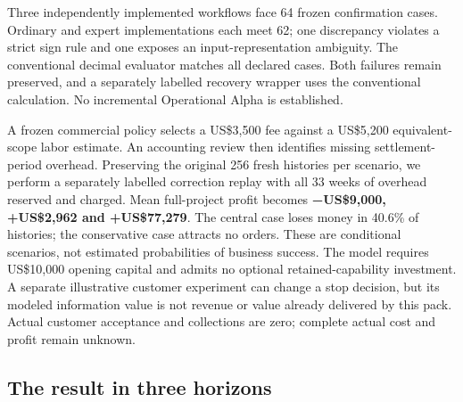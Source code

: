 \documentclass[
  11pt,
  letterpaper,
]{article}
\begin{document}
Three independently implemented workflows face 64 frozen confirmation
cases. Ordinary and expert implementations each meet 62; one discrepancy
violates a strict sign rule and one exposes an input-representation
ambiguity. The conventional decimal evaluator matches all declared
cases. Both failures remain preserved, and a separately labelled
recovery wrapper uses the conventional calculation. No incremental
Operational Alpha is established.

A frozen commercial policy selects a US\$3,500 fee against a US\$5,200
equivalent-scope labor estimate. An accounting review then identifies
missing settlement-period overhead. Preserving the original 256 fresh
histories per scenario, we perform a separately labelled correction
replay with all 33 weeks of overhead reserved and charged. Mean
full-project profit becomes \textbf{−US\$9,000, +US\$2,962 and
+US\$77,279}. The central case loses money in 40.6\% of histories; the
conservative case attracts no orders. These are conditional scenarios,
not estimated probabilities of business success. The model requires
US\$10,000 opening capital and admits no optional retained-capability
investment. A separate illustrative customer experiment can change a
stop decision, but its modeled information value is not revenue or value
already delivered by this pack. Actual customer acceptance and
collections are zero; complete actual cost and profit remain unknown.


\hypertarget{the-result-in-three-horizons}{%
\subsection{The result in three
horizons}\label{the-result-in-three-horizons}}
\end{document}
